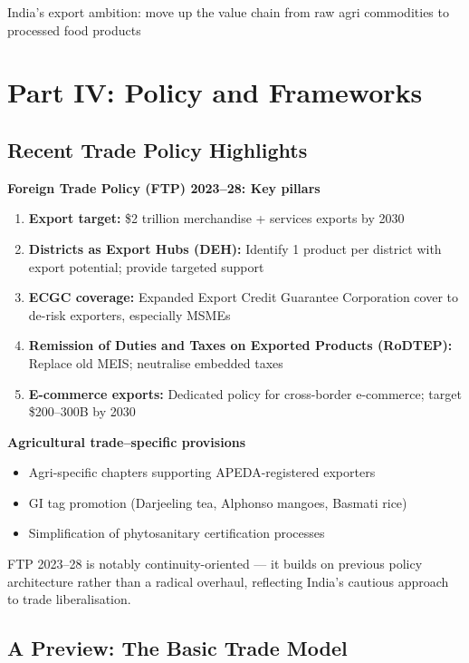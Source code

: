 \documentclass[
  letterpaper,
  DIV=11,
  numbers=noendperiod]{scrartcl}
\providecommand{\tightlist}{%
  \setlength{\itemsep}{0pt}\setlength{\parskip}{0pt}}
\begin{document}
India's export ambition: move up the value chain from raw agri
commodities to processed food products

\section{Part IV: Policy and
Frameworks}\label{part-iv-policy-and-frameworks}

\subsection{Recent Trade Policy
Highlights}\label{recent-trade-policy-highlights}

\textbf{Foreign Trade Policy (FTP) 2023--28: Key pillars}

\begin{enumerate}
\def\labelenumi{\arabic{enumi}.}
\tightlist
\item
  \textbf{Export target:} \$2 trillion merchandise + services exports by
  2030
\item
  \textbf{Districts as Export Hubs (DEH):} Identify 1 product per
  district with export potential; provide targeted support
\item
  \textbf{ECGC coverage:} Expanded Export Credit Guarantee Corporation
  cover to de-risk exporters, especially MSMEs
\item
  \textbf{Remission of Duties and Taxes on Exported Products (RoDTEP):}
  Replace old MEIS; neutralise embedded taxes
\item
  \textbf{E-commerce exports:} Dedicated policy for cross-border
  e-commerce; target \$200--300B by 2030
\end{enumerate}

\textbf{Agricultural trade--specific provisions}

\begin{itemize}
\tightlist
\item
  Agri-specific chapters supporting APEDA-registered exporters
\item
  GI tag promotion (Darjeeling tea, Alphonso mangoes, Basmati rice)
\item
  Simplification of phytosanitary certification processes
\end{itemize}

FTP 2023--28 is notably continuity-oriented --- it builds on previous
policy architecture rather than a radical overhaul, reflecting India's
cautious approach to trade liberalisation.

\subsection{A Preview: The Basic Trade
Model}\label{a-preview-the-basic-trade-model}
\end{document}
